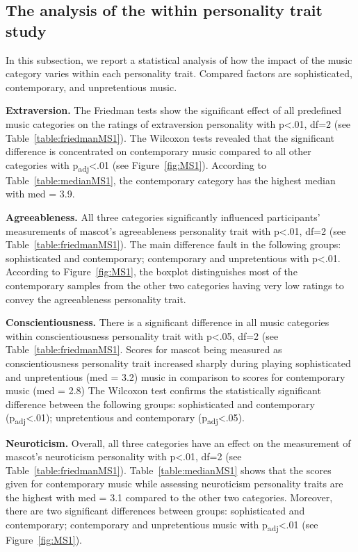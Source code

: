 \subsection{The analysis of the within personality trait study}
\label{subsec:MSstudy1}
In this subsection, we report a statistical analysis of how the impact of the music category varies within each
personality trait.
Compared factors are sophisticated, contemporary, and unpretentious music.

\par\textbf{Extraversion.}
The Friedman tests show the significant effect of all predefined music categories on the
ratings of extraversion personality with p<.01, df=2 (see Table~\ref{table:friedmanMS1}).
The Wilcoxon tests revealed that the significant difference is concentrated on contemporary music
compared to all other categories with p\textsubscript{adj}<.01 (see Figure~\ref{fig:MS1}).
According to Table~\ref{table:medianMS1}, the contemporary category has the highest median with med = 3.9.

\par\textbf{Agreeableness.}
All three categories significantly influenced participants' measurements of mascot's
agreeableness personality trait with p<.01, df=2 (see Table~\ref{table:friedmanMS1}).
The main difference fault in the following groups: sophisticated and contemporary;
contemporary and unpretentious with p<.01.
According to Figure~\ref{fig:MS1}, the boxplot distinguishes most of the contemporary samples from
the other two categories having very low ratings to convey the agreeableness personality trait.

\par\textbf{Conscientiousness.}
There is a significant difference in all music categories within conscientiousness
personality trait with p<.05, df=2 (see Table~\ref{table:friedmanMS1}.
Scores for mascot being measured as conscientiousness personality trait increased sharply during playing
sophisticated and unpretentious (med = 3.2) music in comparison to scores for contemporary music (med = 2.8)
The Wilcoxon test confirms the statistically significant difference between the following groups:
sophisticated and contemporary (p\textsubscript{adj}<.01); unpretentious and contemporary (p\textsubscript{adj}<.05).

\par\textbf{Neuroticism.}
Overall, all three categories have an effect on the measurement of mascot's neuroticism
personality with p<.01, df=2 (see Table~\ref{table:friedmanMS1}).
Table~\ref{table:medianMS1} shows that the scores given for contemporary music while assessing
neuroticism personality traits are the highest with med = 3.1 compared to the other two categories.
Moreover, there are two significant differences between groups: sophisticated and contemporary;
contemporary and unpretentious music with p\textsubscript{adj}<.01 (see Figure~\ref{fig:MS1}).

